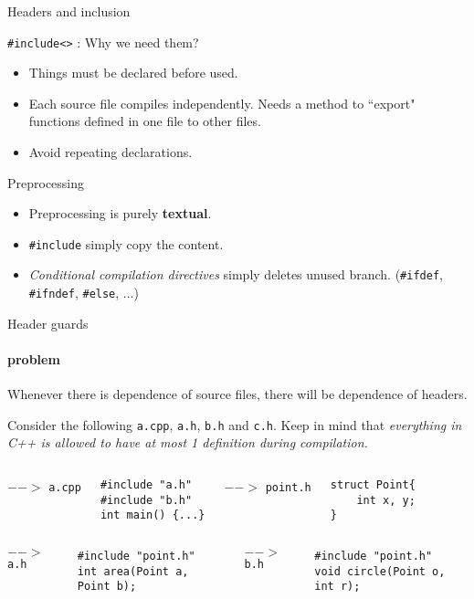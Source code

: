 \begin{frame}{Headers and inclusion}
\begin{block}{\texttt{\#include<>} : Why we need them?}
	\begin{itemize}
		\item Things must be declared before used.
		\item Each source file compiles independently. Needs a method to ``export" functions defined in one file to other files.
		\item Avoid repeating declarations. 
	\end{itemize}
\end{block}
\begin{block}{Preprocessing}
	\begin{itemize}
		\item Preprocessing is purely \textbf{textual}. 
		\item \texttt{\#include} simply copy the content.
		\item \textit{Conditional compilation directives }simply deletes unused branch. (\texttt{\#ifdef}, \texttt{\#ifndef}, \texttt{\#else}, ...)
	\end{itemize}
\end{block}

\end{frame}

\begin{frame}[fragile]{Header guards}
\framesubtitle{problem}
Whenever there is dependence of source files, there will be dependence of headers.

Consider the following \texttt{a.cpp}, \texttt{a.h}, \texttt{b.h} and \texttt{c.h}. Keep in mind that \textit{everything in C++ is allowed to have at most 1 definition during compilation.}

\begin{columns}
	$-->$ \texttt{a.cpp}
\begin{verbatim}
#include "a.h"
#include "b.h"
int main() {...}
\end{verbatim}
$-->$ \texttt{point.h}
\begin{verbatim}
struct Point{
    int x, y;
}
\end{verbatim}
\end{columns}
\vspace{0.2in}
\begin{columns}
	$-->$ \texttt{a.h}
\begin{verbatim}
#include "point.h"
int area(Point a, Point b);
\end{verbatim}
$-->$ \texttt{b.h}
\begin{verbatim}
#include "point.h"
void circle(Point o, int r);
\end{verbatim}
\end{columns}
\end{frame}

